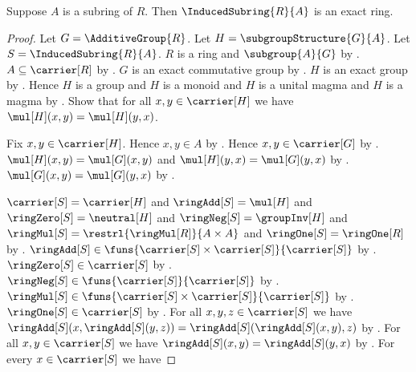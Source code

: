 \begin{theorem}\label{induced_subring_is_exact}
    Suppose $A$ is a subring of $R$.
    Then $\InducedSubring{R}{A}$ is an exact ring.
\end{theorem}
\begin{proof}
    Let $G=\AdditiveGroup{R}$.
    Let $H=\subgroupStructure{G}{A}$.
    Let $S=\InducedSubring{R}{A}$.
    $R$ is a ring and $\subgroup{A}{G}$ by
        .
    $A\subseteq\carrier[R]$ by .
    $G$ is an exact commutative group by
        .
    $H$ is an exact group by .
    Hence $H$ is a group and $H$ is a monoid and
        $H$ is a unital magma and $H$ is a magma by
        .
    Show that for all $x,y\in\carrier[H]$ we have
        $\mul[H](x,y)=\mul[H](y,x)$.
    \begin{subproof}
        Fix $x,y\in\carrier[H]$.
        Hence $x,y\in A$ by .
        Hence $x,y\in\carrier[G]$ by
            .
        $\mul[H](x,y)=\mul[G](x,y)$ and
            $\mul[H](y,x)=\mul[G](y,x)$ by
            .
        $\mul[G](x,y)=\mul[G](y,x)$ by
            .
    \end{subproof}
    $\carrier[S]=\carrier[H]$ and $\ringAdd[S]=\mul[H]$ and
        $\ringZero[S]=\neutral[H]$ and
        $\ringNeg[S]=\groupInv[H]$ and
        $\ringMul[S]=\restrl{\ringMul[R]}{A\times A}$ and
        $\ringOne[S]=\ringOne[R]$ by
        .
    $\ringAdd[S]\in
        \funs{\carrier[S]\times\carrier[S]}{\carrier[S]}$ by
        .
    $\ringZero[S]\in\carrier[S]$ by .
    $\ringNeg[S]\in\funs{\carrier[S]}{\carrier[S]}$ by
        .
    $\ringMul[S]\in
        \funs{\carrier[S]\times\carrier[S]}{\carrier[S]}$ by
        .
    $\ringOne[S]\in\carrier[S]$ by
        .
    For all $x,y,z\in\carrier[S]$ we have
        $\ringAdd[S](x,\ringAdd[S](y,z))
            =\ringAdd[S](\ringAdd[S](x,y),z)$ by
        .
    For all $x,y\in\carrier[S]$ we have
        $\ringAdd[S](x,y)=\ringAdd[S](y,x)$ by \auto.
    For every $x\in\carrier[S]$ we have

\end{proof}

